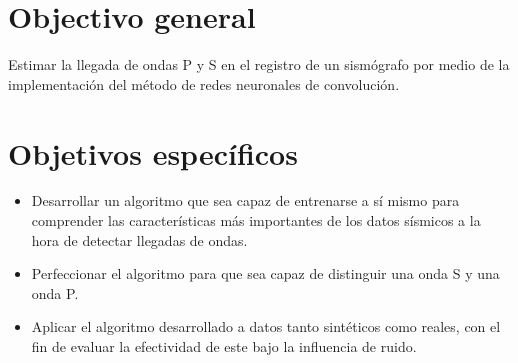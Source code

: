 \documentclass[../main.tex]{subfiles}
\begin{document}
\section{Objectivo general}
Estimar la llegada de ondas P y S en el registro de un sismógrafo por medio de la implementación del método de redes neuronales de convolución.  
\section{Objetivos específicos}
\begin{itemize}
    \item Desarrollar un algoritmo que sea capaz de entrenarse a sí mismo para comprender las características más importantes de los datos sísmicos a la hora de detectar llegadas de ondas.
    \item Perfeccionar el algoritmo para que sea capaz de distinguir una onda S y una onda P. 
    \item Aplicar el algoritmo desarrollado a datos tanto sintéticos como reales, con el fin de evaluar la efectividad de este bajo la influencia de ruido. 
\end{itemize}
\end{document}
